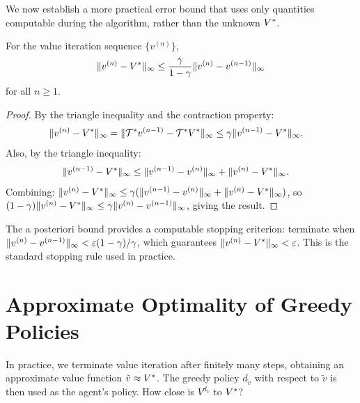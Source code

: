 \documentclass[11pt,a4paper]{article}
\begin{document}
We now establish a more practical error bound that uses only
quantities computable during the algorithm, rather than the unknown
$V^*$.

\begin{theorem}
\label{thm:aposteriori}
For the value iteration sequence $\{v^{(n)}\}$,
\[
    \|v^{(n)} - V^*\|_\infty
    \leq \frac{\gamma}{1 - \gamma}
    \|v^{(n)} - v^{(n-1)}\|_\infty
\]
for all $n \geq 1$.
\end{theorem}

\begin{proof}
By the triangle inequality and the contraction property:
\begin{align*}
    \|v^{(n)} - V^*\|_\infty
    &= \|\mathcal{T}^* v^{(n-1)} - \mathcal{T}^* V^*\|_\infty
    \leq \gamma \|v^{(n-1)} - V^*\|_\infty.
\end{align*}
Also, by the triangle inequality:
\begin{align*}
    \|v^{(n-1)} - V^*\|_\infty
    &\leq \|v^{(n-1)} - v^{(n)}\|_\infty
    + \|v^{(n)} - V^*\|_\infty.
\end{align*}
Combining: $\|v^{(n)} - V^*\|_\infty \leq
\gamma(\|v^{(n-1)} - v^{(n)}\|_\infty +
\|v^{(n)} - V^*\|_\infty)$, so
$(1 - \gamma)\|v^{(n)} - V^*\|_\infty \leq
\gamma \|v^{(n)} - v^{(n-1)}\|_\infty$, giving the result.
\end{proof}

\begin{remark}
\label{rem:stopping}
The a posteriori bound provides a computable stopping criterion:
terminate when $\|v^{(n)} - v^{(n-1)}\|_\infty <
\varepsilon(1-\gamma)/\gamma$, which guarantees
$\|v^{(n)} - V^*\|_\infty < \varepsilon$. This is the standard
stopping rule used in practice.
\end{remark}


\section{Approximate Optimality of Greedy Policies}
\label{sec:approximate-optimality}

In practice, we terminate value iteration after finitely many steps,
obtaining an approximate value function $\tilde{v} \approx V^*$.
The greedy policy $d_{\tilde{v}}$ with respect to $\tilde{v}$ is then
used as the agent's policy. How close is $V^{d_{\tilde{v}}}$ to
$V^*$?
\end{document}
